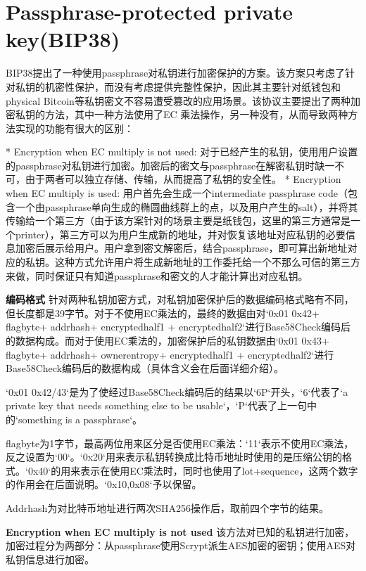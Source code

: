 \documentclass{article}
\begin{document}
\section{Passphrase-protected private key(BIP38)}
BIP38提出了一种使用passphrase对私钥进行加密保护的方案。该方案只考虑了针对私钥的机密性保护，而没有考虑提供完整性保护，因此其主要针对纸钱包和physical Bitcoin等私钥密文不容易遭受篡改的应用场景。该协议主要提出了两种加密私钥的方法，其中一种方法使用了EC 乘法操作，另一种没有，从而导致两种方法实现的功能有很大的区别：

* Encryption when EC multiply is not used: 对于已经产生的私钥，使用用户设置的passphrase对私钥进行加密。加密后的密文与passphrase在解密私钥时缺一不可，由于两者可以独立存储、传输，从而提高了私钥的安全性。
* Encryption when EC multiply is used: 用户首先会生成一个intermediate passphrase code（包含一个由passphrase单向生成的椭圆曲线群上的点，以及用户产生的salt），并将其传输给一个第三方（由于该方案针对的场景主要是纸钱包，这里的第三方通常是一个printer），第三方可以为用户生成新的地址，并对恢复该地址对应私钥的必要信息加密后展示给用户。用户拿到密文解密后，结合passphrase，即可算出新地址对应的私钥。这种方式允许用户将生成新地址的工作委托给一个不那么可信的第三方来做，同时保证只有知道passphrase和密文的人才能计算出对应私钥。



\textbf{ 编码格式}
针对两种私钥加密方式，对私钥加密保护后的数据编码格式略有不同，但长度都是39字节。对于不使用EC乘法的，最终的数据由对`0x01 0x42+ flagbyte+ addrhash+ encryptedhalf1 + encryptedhalf2`进行Base58Check编码后的数据构成。而对于使用EC乘法的，加密保护后的私钥数据由`0x01 0x43+ flagbyte+ addrhash+ ownerentropy+ encryptedhalf1 + encryptedhalf2`进行Base58Check编码后的数据构成（具体含义会在后面详细介绍）。

`0x01 0x42/43`是为了使经过Base58Check编码后的结果以`6P`开头，`6`代表了`a private key that needs something else to be usable`，`P`代表了上一句中的`something is a passphrase`。

flagbyte为1字节，最高两位用来区分是否使用EC乘法：`11`表示不使用EC乘法，反之设置为`00`。`0x20`用来表示私钥转换成比特币地址时使用的是压缩公钥的格式。`0x40`的用来表示在使用EC乘法时，同时也使用了lot+sequence，这两个数字的作用会在后面说明。`0x10,0x08`予以保留。

Addrhash为对比特币地址进行两次SHA256操作后，取前四个字节的结果。

\textbf{Encryption when EC multiply is not used}
该方法对已知的私钥进行加密，加密过程分为两部分：从passphrase使用Scrypt派生AES加密的密钥；使用AES对私钥信息进行加密。
\end{document}
